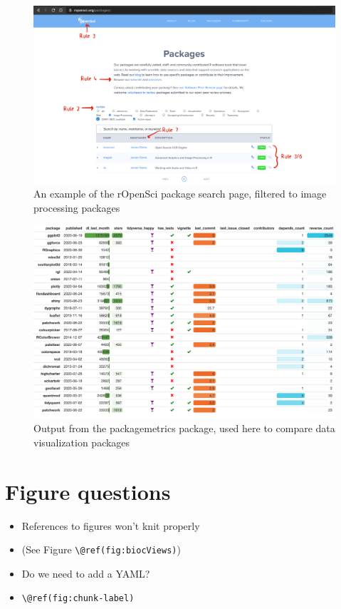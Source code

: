 \documentclass[10pt,letterpaper]{article}
\providecommand{\tightlist}{%
  \setlength{\itemsep}{0pt}\setlength{\parskip}{0pt}}
\begin{document}
\begin{figure}
\includegraphics[width=1\linewidth]{../figures/ropensci_imgproc} \caption{An example of the rOpenSci package search page, filtered to image processing packages}\label{fig:ropensci_imgproc}
\end{figure}

\begin{figure}
\includegraphics[width=1\linewidth]{../figures/packagemetrics} \caption{Output from the packagemetrics package, used here to compare data visualization packages}\label{fig:packagemetrics}
\end{figure}

\hypertarget{figure-questions}{%
\section{Figure questions}\label{figure-questions}}

\begin{itemize}
\tightlist
\item
  References to figures won't knit properly
\item
  (See Figure \texttt{\textbackslash{}@ref(fig:biocViews)})
\item
  Do we need to add a YAML?
\item
  \texttt{\textbackslash{}@ref(fig:chunk-label)}
\end{itemize}
\end{document}
